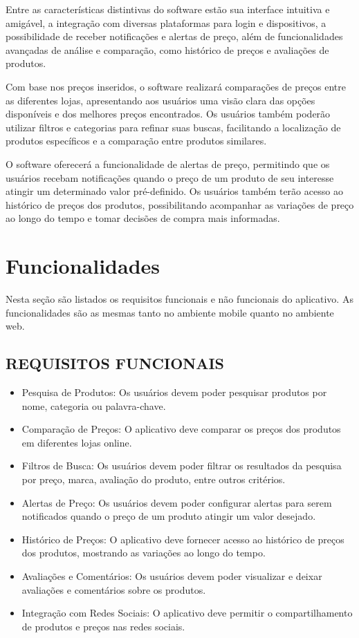 Entre as características distintivas do software estão sua interface intuitiva e amigável, a integração com diversas plataformas para login e dispositivos, a possibilidade de receber notificações e alertas de preço, além de funcionalidades avançadas de análise e comparação, como histórico de preços e avaliações de produtos.

Com base nos preços inseridos, o software realizará comparações de preços entre as diferentes lojas, apresentando aos usuários uma visão clara das opções disponíveis e dos melhores preços encontrados. Os usuários também poderão utilizar filtros e categorias para refinar suas buscas, facilitando a localização de produtos específicos e a comparação entre produtos similares.

O software oferecerá a funcionalidade de alertas de preço, permitindo que os usuários recebam notificações quando o preço de um produto de seu interesse atingir um determinado valor pré-definido. Os usuários também terão acesso ao histórico de preços dos produtos, possibilitando acompanhar as variações de preço ao longo do tempo e tomar decisões de compra mais informadas.


\section{Funcionalidades} \label{sec:funcionalidades}

Nesta seção são listados os requisitos funcionais e não funcionais do aplicativo. As funcionalidades são as mesmas tanto no ambiente mobile quanto no ambiente web.

\subsection{REQUISITOS FUNCIONAIS}
\begin{itemize}
  \item Pesquisa de Produtos: Os usuários devem poder pesquisar produtos por nome, categoria ou palavra-chave.
  \item Comparação de Preços: O aplicativo deve comparar os preços dos produtos em diferentes lojas online.
  \item Filtros de Busca: Os usuários devem poder filtrar os resultados da pesquisa por preço, marca, avaliação do produto, entre outros critérios.
  \item Alertas de Preço: Os usuários devem poder configurar alertas para serem notificados quando o preço de um produto atingir um valor desejado.
  \item Histórico de Preços: O aplicativo deve fornecer acesso ao histórico de preços dos produtos, mostrando as variações ao longo do tempo.
  \item Avaliações e Comentários: Os usuários devem poder visualizar e deixar avaliações e comentários sobre os produtos.
  \item Integração com Redes Sociais: O aplicativo deve permitir o compartilhamento de produtos e preços nas redes sociais.
\end{itemize}



